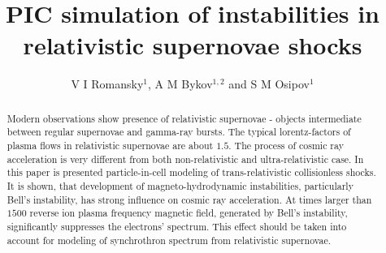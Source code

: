 \documentclass[a4paper]{jpconf}
\begin{document}
	\title{PIC simulation of instabilities in relativistic supernovae shocks}
	
	\author{V I Romansky$^{1}$, A M Bykov$^{1,2}$ and S M Osipov$^{1}$}
	
	\address{$^1$ Ioffe Institute, 26 Politekhnicheskaya st., St. Petersburg 194021, Russia}
	\address{$^2$ Peter the Great St. Petersburg Polytechnic University, 29 Politekhnicheskaya st., St. Petersburg 195251, Russia}
	
	
	\begin{abstract}
                 Modern observations show presence of relativistic supernovae - objects intermediate between regular supernovae and gamma-ray bursts. The typical lorentz-factors of plasma flows in relativistic supernovae are about $1.5$. The process of cosmic ray acceleration is very different from both non-relativistic and ultra-relativistic case. In this paper is presented particle-in-cell modeling of trans-relativistic collisionless shocks. It is shown, that development of magneto-hydrodynamic instabilities, particularly Bell's instability, has strong influence on cosmic ray acceleration. At times larger than $1500$ reverse ion plasma frequency magnetic field, generated by Bell's instability, significantly suppresses the electrons' spectrum. This effect should be taken into account for modeling of synchrothron spectrum from relativistic supernovae.
	\end{abstract}
	
\end{document}

